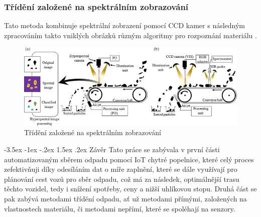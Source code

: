 \documentclass[a4paper,10pt]{article}
\makeatletter
\theoremstyle{definition}
\renewcommand\section{\@startsection {section}{1}{\z@}%
                                   {-3.5ex \@plus -1ex \@minus -.2ex}%
                                   {1.5ex \@plus.2ex}%
                                   {\large\bfseries}}
\makeatother
\begin{document}
\subsubsection*{Třídění založené na spektrálním zobrazování}
Tato metoda kombinuje spektrální zobrazení pomocí CCD kamer s následným zpracováním takto vniklých obrázků různým algoritmy pro rozpoznání materiálu \cite{GUNDUPALLI201756}.

\begin{figure}[H]
\begin{center}
\includegraphics[scale=0.8]{Images/spektrální.jpg}
\caption{Třídění založené na spektrálním zobrazování \cite{GUNDUPALLI201756}}
\label{fig:1}
\end{center}
\end{figure}




\section{Závěr}
\label{sec:2}
Tato práce se zabývala v první části automatizovaným sběrem odpadu pomocí IoT chytré popelnice, které celý proces zefektivňuji díky odesíláním dat o míře zaplnění, které se dále využívají pro plánování cest vozů pro sběr odpadu, což má za následek, optimálnější trasu těchto vozidel, tedy i snížení spotřeby, ceny a nižší uhlíkovou stopu. Druhá část se pak zabývá metodami třídění odpadu, ať už metodami přímými, založených na vlastnostech materiálu, či metodami nepřímí, které se spoléhají na senzory. 

%
\newpage
\begingroup
\makeatletter
\renewcommand\section{\@startsection {section}{1}{\z@}%
                                   {-3.5ex \@plus -1ex \@minus -.2ex}%
                                   {4.5ex \@plus.2ex}%
                                   {\large\bfseries}}
\makeatother

\renewcommand\refname{Zdroje}


\endgroup
\end{document}
